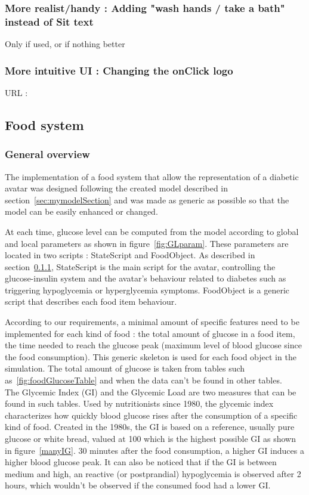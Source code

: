 \subsubsection{More realist/handy : Adding "wash hands / take a bath" instead of Sit text}
Only if used, or if nothing better
\subsubsection{More intuitive UI : Changing the onClick logo}
URL : %


\subsection{Food system}

\subsubsection{General overview}
The implementation of a food system that allow the representation of a diabetic avatar was designed following the created model described in section~\ref{sec:mymodelSection} and was made as generic as possible so that the model can be easily enhanced or changed.

At each time, glucose level can be computed from the model according to global and local parameters as shown in figure~\ref{fig:GLparam}. These parameters are located in two scripts : StateScript and FoodObject. As described in section~\ref{}, StateScript is the main script for the avatar, controlling the glucose-insulin system and the avatar's behaviour related to diabetes such as triggering hypoglycemia or hyperglycemia symptoms. FoodObject is a generic script that describes each food item behaviour. 

According to our requirements, a minimal amount of specific features need to be implemented for each kind of food : the total amount of glucose in a food item, the time needed to reach the glucose peak (maximum level of blood glucose since the food consumption). This generic skeleton is used for each food object in the simulation. The total amount of glucose is taken from tables such as~\ref{fig:foodGlucoseTable} and \cite{nutritiondataWebsite} %
when the data can't be found in other tables. 
\\
The Glycemic Index (GI) and the Glycemic Load are two measures %
that can be found in such tables. Used by nutritionists since 1980, the glycemic index characterizes how quickly blood glucose rises after the consumption of a specific kind of food. 
Created in the 1980s, the GI is based on a reference, usually pure glucose or white bread, valued at 100 which is the highest possible GI as shown in figure~\ref{manyIG}. 30 minutes after the food consumption, a higher GI induces a higher blood glucose peak. It can also be noticed that if the GI is between medium and high, an reactive (or postprandial) hypoglycemia is observed after 2 hours, which wouldn't be observed if the consumed food had a lower GI.

